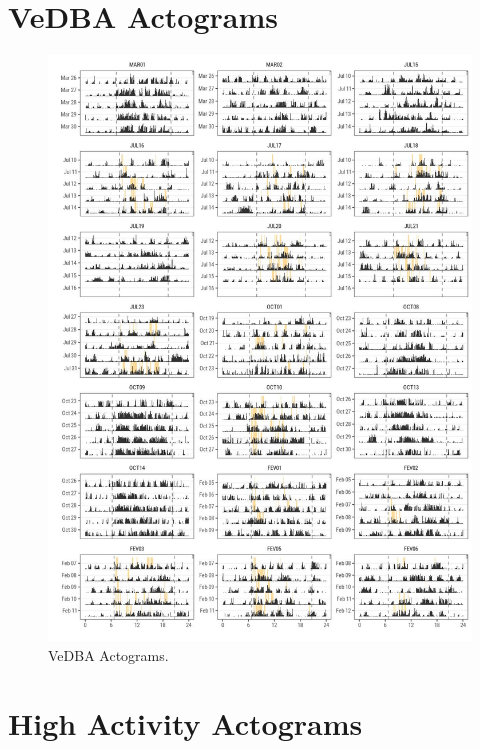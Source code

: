 \documentclass[msc,numbers,hidelinks]{coppe}
\begin{document}
  \hypertarget{vedba-actograms}{%
  \section{VeDBA Actograms}\label{vedba-actograms}}
  \begin{figure}

  {\centering \includegraphics[width=1\linewidth]{../04_figures/actograms/actograms_vedba} 

  }

  \caption{VeDBA Actograms.}\label{fig:vedba-actograms}
  \end{figure}
  \hypertarget{high-activity-actograms}{%
  \section{High Activity Actograms}\label{high-activity-actograms}}
\end{document}
